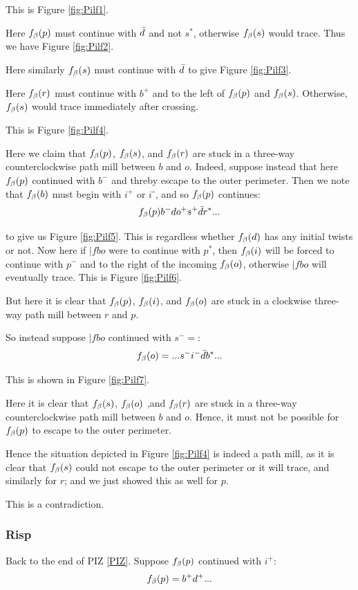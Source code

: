 This is Figure \ref{fig:Pilf1}.

Here $f_\beta(p)$ must continue with $\bar{d}$ and not $s^*$, otherwise $f_\beta(s)$ would trace. Thus we have Figure \ref{fig:Pilf2}.

Here similarly $f_\beta(s)$ must continue with $\bar{d}$ to give Figure \ref{fig:Pilf3}.

Here $f_\beta(r)$ must continue with $b^+$ and to the left of $f_\beta(p)$ and $f_\beta(s)$. Otherwise, $f_\beta(s)$ would trace immediately after crossing.

This is Figure \ref{fig:Pilf4}.

Here we claim that $f_\beta(p)$, $f_\beta(s)$, and $f_\beta(r)$ are stuck in a three-way counterclockwise path mill between $b$ and $o$. Indeed, suppose instead that here $f_\beta(p)$ continued with $b^-$ and threby escape to the outer perimeter. Then we note that $f_\beta(b)$ must begin with $i^+$ or $i^\circ$, and so $f_\beta(p)$ continues:
\[
f_\beta(p)  b^- d o^+ s^+ \bar{d} r^*...
\]

to give us Figure \ref{fig:Pilf5}. This is regardless whether $f_\beta(d)$ has any initial twists or not. Now here if $|fbo$ were to continue with $p^*$, then $f_\beta(i)$ will be forced to continue with $p^-$ and to the right of the incoming $f_\beta(o)$, otherwise $|fbo$ will eventually trace. This is Figure \ref{fig:Pilf6}. 

But here it is clear that $f_\beta(p)$, $f_\beta(i)$, and $f_\beta(o)$ are stuck in a clockwise three-way path mill between $r$ and $p$.

So instead suppose $|fbo$ continued with $s^-=$:
\[
f_\beta(o) = ...s^- i^- \bar{d} b^*...
\]

This is shown in Figure \ref{fig:Pilf7}.

Here it is clear that $f_\beta(s)$, $f_\beta(o)$ ,and $f_\beta(r)$ are stuck in a three-way counterclockwise path mill between $b$ and $o$. Hence, it must not be possible for $f_\beta(p)$ to escape to the outer perimeter.

Hence the situation depicted in Figure \ref{fig:Pilf4} is indeed a path mill, as it is clear that $f_\beta(s)$ could not escape to the outer perimeter or it will trace, and similarly for $r$; and we just showed this as well for $p$.

This is a contradiction.

\subsubsection{Risp}\label{Risp}
Back to the end of PIZ \ref{PIZ}. Suppose $f_\beta(p)$ continued with $i^+$:
\[
f_\beta(p) = b^+ d ^+...
\]

